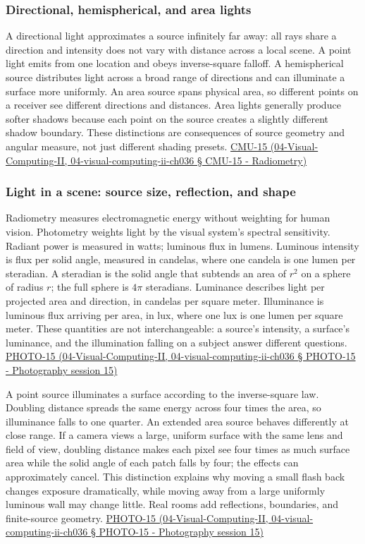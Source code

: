\subsubsection{Directional, hemispherical, and area lights}\label{directional-hemispherical-and-area-lights}

A directional light approximates a source infinitely far away: all rays share a direction and intensity does not vary with distance across a local scene. A point light emits from one location and obeys inverse-square falloff. A hemispherical source distributes light across a broad range of directions and can illuminate a surface more uniformly. An area source spans physical area, so different points on a receiver see different directions and distances. Area lights generally produce softer shadows because each point on the source creates a slightly different shadow boundary. These distinctions are consequences of source geometry and angular measure, not just different shading presets. \href{}{CMU-15 (04-Visual-Computing-II, 04-visual-computing-ii-ch036 § CMU-15 - Radiometry)}

\subsubsection{Light in a scene: source size, reflection, and shape}\label{light-in-a-scene-source-size-reflection-and-shape}

Radiometry measures electromagnetic energy without weighting for human vision. Photometry weights light by the visual system's spectral sensitivity. Radiant power is measured in watts; luminous flux in lumens. Luminous intensity is flux per solid angle, measured in candelas, where one candela is one lumen per steradian. A steradian is the solid angle that subtends an area of \(r^2\) on a sphere of radius \(r\); the full sphere is \(4\pi\) steradians. Luminance describes light per projected area and direction, in candelas per square meter. Illuminance is luminous flux arriving per area, in lux, where one lux is one lumen per square meter. These quantities are not interchangeable: a source's intensity, a surface's luminance, and the illumination falling on a subject answer different questions. \href{}{PHOTO-15 (04-Visual-Computing-II, 04-visual-computing-ii-ch036 § PHOTO-15 - Photography session 15)}

A point source illuminates a surface according to the inverse-square law. Doubling distance spreads the same energy across four times the area, so illuminance falls to one quarter. An extended area source behaves differently at close range. If a camera views a large, uniform surface with the same lens and field of view, doubling distance makes each pixel see four times as much surface area while the solid angle of each patch falls by four; the effects can approximately cancel. This distinction explains why moving a small flash back changes exposure dramatically, while moving away from a large uniformly luminous wall may change little. Real rooms add reflections, boundaries, and finite-source geometry. \href{}{PHOTO-15 (04-Visual-Computing-II, 04-visual-computing-ii-ch036 § PHOTO-15 - Photography session 15)}

